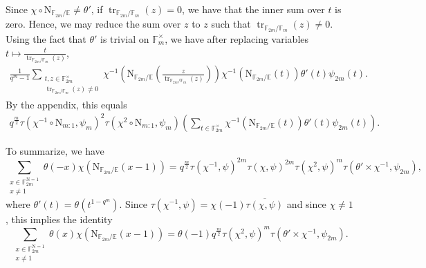 \documentclass[12pt, reqno]{amsart}
\theoremstyle{definition}
\theoremstyle{definition}
\theoremstyle{definition}
\newcommand{\multiplicativegroup}[1]{#1^{\times}}
\newcommand{\conjugate}[1]{\overline{#1}}
\newcommand{\fieldCharacter}{\psi}
\newcommand{\trace}{\operatorname{tr}}
\newcommand{\FieldNorm}[2]{\mathrm{N}_{#1:#2}}
\newcommand{\aFieldNorm}{\mathrm{N}}
\newcommand{\finiteField}{\mathbb{F}}
\newcommand{\quadraticExtension}{\mathbb{E}}
\newcommand{\finiteFieldExtension}[1]{\finiteField_{#1}}
\newcommand{\NormOneGroup}[1]{\finiteFieldExtension{#1}^{\aFieldNorm = 1}}
\begin{document}
Since $\chi \circ \aFieldNorm_{\finiteFieldExtension{2m} \slash \quadraticExtension} \ne \theta'$, if $\trace_{\finiteFieldExtension{2m} \slash \finiteFieldExtension{m}}\left(z\right) = 0$, we have that the inner sum over $t$ is zero. Hence, we may reduce the sum over $z$ to $z$ such that $\trace_{\finiteFieldExtension{2m} \slash \finiteFieldExtension{m}}\left(z\right) \ne 0$. Using the fact that $\theta'$ is trivial on $\multiplicativegroup{\finiteFieldExtension{m}}$, we have after replacing variables $t \mapsto \frac{t}{\trace_{\finiteFieldExtension{2m} \slash \finiteFieldExtension{m}}\left(z\right)}$,
\begin{align*}
	\frac{1}{q^m-1}\sum_{\substack{t,z \in \multiplicativegroup{\finiteFieldExtension{2m}}\\
	\trace_{\finiteFieldExtension{2m} \slash \finiteFieldExtension{m}}\left(z\right) \ne 0}} \chi^{-1}\left(\aFieldNorm_{\finiteFieldExtension{2m} \slash \quadraticExtension}\left(\frac{z}{\trace_{\finiteFieldExtension{2m} \slash \finiteFieldExtension{m}}\left(z\right) }\right)\right) \chi^{-1}\left(\aFieldNorm_{\finiteFieldExtension{2m} \slash \quadraticExtension}\left(t\right)\right) \theta' \left(t\right) \fieldCharacter_{2m}\left(t\right).
\end{align*}
By the appendix, this equals
\begin{align*}
	q^{\frac{m}{2}} \tau\left(\chi^{-1} \circ \FieldNorm{m}{1}, \fieldCharacter_m\right)^2 \tau\left(\chi^{2} \circ \FieldNorm{m}{1}, \fieldCharacter_m\right) \left(\sum_{t \in \multiplicativegroup{\finiteFieldExtension{2m}}} \chi^{-1}\left(\aFieldNorm_{\finiteFieldExtension{2m} \slash \quadraticExtension}\left(t\right)\right) \theta' \left(t\right) \fieldCharacter_{2m}\left(t\right)\right).
\end{align*}

To summarize, we have
$$\sum_{\substack{x \in \NormOneGroup{2m}\\
		x \ne 1}} \theta \left(-x\right) \chi\left(\aFieldNorm_{\finiteFieldExtension{2m} \slash \quadraticExtension}\left(x - 1\right)\right) = q^{\frac{m}{2}} \tau\left(\chi^{-1}, \fieldCharacter\right)^{2m} \tau\left(\chi, \fieldCharacter\right)^{2m} \tau\left(\chi^{2}, \fieldCharacter\right)^m \tau\left(\theta' \times \chi^{-1}, \fieldCharacter_{2m}\right),$$
	where $\theta'\left(t\right) = \theta\left(t^{1-q^m}\right)$.
Since $\tau\left(\chi^{-1}, \fieldCharacter\right) = \chi\left(-1\right) \conjugate{\tau\left(\chi, \fieldCharacter\right)}$ and since $\chi \ne 1$, this implies the identity
$$\sum_{\substack{x \in \NormOneGroup{2m}\\
		x \ne 1}} \theta \left(x\right) \chi\left(\aFieldNorm_{\finiteFieldExtension{2m} \slash \quadraticExtension}\left(x - 1\right)\right) = \theta\left(-1\right) q^{\frac{m}{2}} \tau\left(\chi^{2}, \fieldCharacter\right)^m \tau\left(\theta' \times \chi^{-1}, \fieldCharacter_{2m}\right).$$
\end{document}
